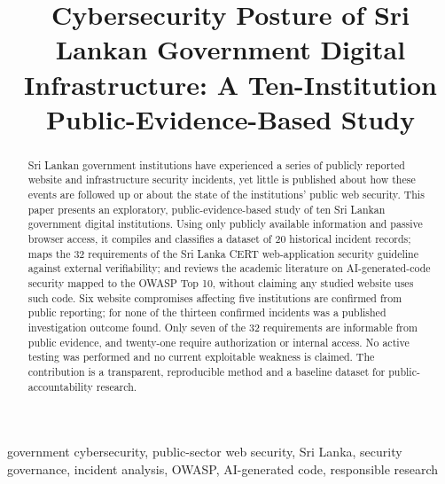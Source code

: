 \documentclass[conference]{IEEEtran}
\begin{document}
\title{Cybersecurity Posture of Sri Lankan Government Digital Infrastructure: A
Ten-Institution Public-Evidence-Based Study}

\author{
}

\maketitle

\begin{abstract}
Sri Lankan government institutions have experienced a series of publicly reported website and
infrastructure security incidents, yet little is published about how these events are followed
up or about the state of the institutions' public web security. This paper presents an
exploratory, public-evidence-based study of ten Sri Lankan government digital institutions.
Using only publicly available information and passive browser access, it compiles and
classifies a dataset of 20 historical incident records; maps the 32 requirements of the Sri
Lanka CERT web-application security guideline against external verifiability; and reviews the
academic literature on AI-generated-code security mapped to the OWASP Top 10, without claiming
any studied website uses such code. Six website compromises affecting five institutions are
confirmed from public reporting; for none of the thirteen confirmed incidents was a published
investigation outcome found. Only seven of the 32 requirements are informable from public
evidence, and twenty-one require authorization or internal access. No active testing was
performed and no current exploitable weakness is claimed. The contribution is a transparent,
reproducible method and a baseline dataset for public-accountability research.
\end{abstract}

\begin{IEEEkeywords}
government cybersecurity, public-sector web security, Sri Lanka, security governance, incident
analysis, OWASP, AI-generated code, responsible research
\end{IEEEkeywords}
\end{document}
